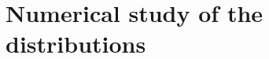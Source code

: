 \documentclass[11pt,fleqn]{article}
\numberwithin{equation}{section}
\def\bigO{{\cal O}}
\begin{document}




\section{Numerical study of the distributions}\label{section numerics}
\end{document}
